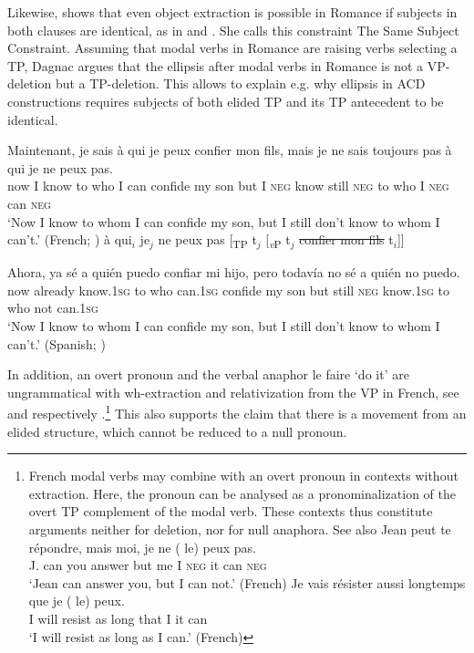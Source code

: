 \documentclass[output=paper,colorlinks,citecolor=brown,
modfonts
]{langscibook}
\begin{document}
\noindent Likewise, \cite{Dagnac2010} shows that even object extraction is possible in Romance if subjects in both clauses are identical, as in  and . She calls this constraint The Same Subject Constraint. Assuming that modal verbs in Romance are raising verbs selecting a TP, Dagnac argues that the ellipsis after modal verbs in Romance is not a VP-deletion but a TP-deletion. This allows to explain e.g. why ellipsis in ACD constructions requires subjects of both elided TP and its TP antecedent to be identical.

\begin{exe}
\ex \label{8} 
\begin{xlist}
\ex \label{8a}\gll Maintenant, je sais à qui je peux confier mon fils, mais je ne sais toujours pas  à qui je ne peux pas. \\
now I know to who I can confide my son but I \textsc{neg} know still \textsc{neg} to who I \textsc{neg} can \textsc{neg} \\
\glt `Now I know to whom I can confide my son, but I still don't know to whom I can't.'	\hfill (French; \citealt{Dagnac2010})
\ex {\ldots}{} à qui$_{i}$ je$_{j}$  ne peux pas [\textsubscript{TP} t$_{j}$ [\textsubscript{\textit{v}P} t$_{j}$  \sout{confier mon fils} t$_{i}$]]
\end{xlist} 

\ex \label{9} 
\gll Ahora, ya sé a quién puedo confiar mi hijo, pero todavía no sé a quién no puedo.\\
now already know.\textsc{1sg} to who can.\textsc{1sg} confide my son but still \textsc{neg} know.\textsc{1sg} to who not can.\textsc{1sg}\\
\glt `Now I know to whom I can confide my son, but I still don't know to whom I can't.' \hfill (Spanish; \citealt{Dagnac2010})
\end{exe}

\noindent In addition, an overt pronoun and the verbal anaphor le faire `do it' are ungrammatical with wh-extraction and relativization from the VP in French, see  and  respectively \citep{Dagnac2008}.\footnote{French modal verbs may combine with an overt pronoun in contexts without extraction. Here, the pronoun can be analysed as a pronominalization of the overt TP complement of the modal verb. These contexts thus constitute arguments neither for deletion, nor for null anaphora. See also 
\ea \gll Jean peut te répondre, mais moi, je ne (\hspace{-2pt} le) peux pas.\\
J. can  you answer  but me  I  \textsc{neg} {} it can  \textsc{neg} \\
\glt `Jean can answer you, but I can not.' \hfill (French)\z 
\ea \gll Je vais résister aussi longtemps que je (\hspace{-2pt} le) peux.\\
I   will resist as   long that  I   {} it  can\\
\glt `I will resist as long as I can.' \hfill (French)\z\label{fn:3}} This also supports the claim that there is a movement from an elided structure, which cannot be reduced to a null pronoun. 
\end{document}
